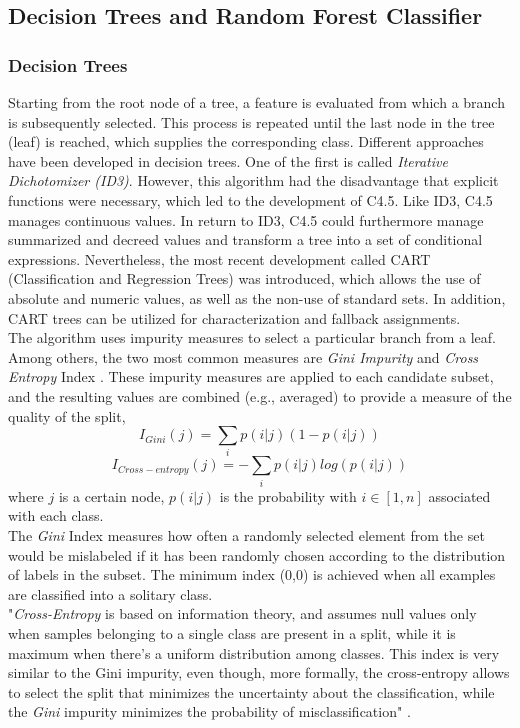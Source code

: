 \documentclass[a4paper, 11pt,titlepage,oneside,openany]{book}
\begin{document}
\subsection{Decision Trees and Random Forest Classifier}
\subsubsection{Decision Trees}
Starting from the root node of a tree, a feature is evaluated from which a branch is subsequently selected. This process is repeated until the last node in the tree (leaf) is reached, which supplies the corresponding class. Different approaches have been developed in decision trees. One of the first is called \textit{Iterative Dichotomizer (ID3)}. However, this algorithm had the disadvantage that explicit functions were necessary, which led to the development of C4.5. Like ID3, C4.5 manages continuous values. In return to ID3, C4.5 could furthermore manage summarized and decreed values and transform a tree into a set of conditional expressions. Nevertheless, the most recent development called CART (Classification and Regression Trees) was introduced, which allows the use of absolute and numeric values, as well as the non-use of standard sets. In addition, CART trees can be utilized for characterization and fallback assignments. \cite{algorithms2}\\
\noindent The algorithm uses impurity measures to select a particular branch from a leaf. Among others, the two most common measures are \textit{Gini Impurity} and \textit{Cross Entropy} Index \cite{algorithms}. 
\newpage
\noindent These impurity measures are  applied to each candidate subset, and the resulting values are combined (e.g., averaged) to provide a measure of the quality of the split,
\[
I_{Gini}(j)=\sum_{i}p(i|j)(1-p(i|j))
\]
\[
I_{Cross-entropy}(j)=-\sum_{i}p(i|j)log(p(i|j))
\]
where $j$ is a certain node, $p(i|j)$ is the probability with $i \in [1,n]$ associated with each class.\\
\noindent The \textit{Gini} Index measures how often a randomly selected element from the set would be mislabeled if it has been randomly chosen according to the distribution of labels in the subset. The minimum index (0,0) is achieved when all examples are classified into a solitary class.\\
\noindent "\textit{Cross-Entropy} is based on information theory, and assumes null values only when samples belonging to a single class are present in a split, while it is maximum when there's a uniform distribution among classes. This index is very similar to the Gini impurity, even though, more formally, the cross-entropy allows to select the split that minimizes the uncertainty about the classification, while the \textit{Gini} impurity minimizes the probability of misclassification" \cite{algorithms}.
\end{document}
